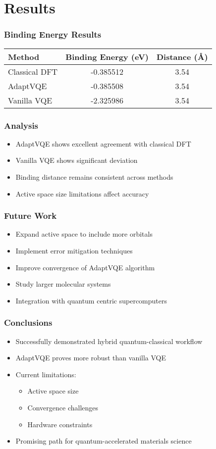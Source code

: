 \section{Results}

\begin{frame}
\frametitle{Binding Energy Results}
\begin{table}
\begin{tabular}{lcc}
\hline
Method & Binding Energy (eV) & Distance (Å) \\
\hline
Classical DFT & -0.385512 & 3.54 \\
AdaptVQE & -0.385508 & 3.54 \\
Vanilla VQE & -2.325986 & 3.54 \\
\hline
\end{tabular}
\end{table}
\end{frame}

\begin{frame}
\frametitle{Analysis}
\begin{itemize}
    \item AdaptVQE shows excellent agreement with classical DFT
    \item Vanilla VQE shows significant deviation
    \item Binding distance remains consistent across methods
    \item Active space size limitations affect accuracy
\end{itemize}
\end{frame}

\begin{frame}
\frametitle{Future Work}
\begin{itemize}
    \item Expand active space to include more orbitals
    \item Implement error mitigation techniques
    \item Improve convergence of AdaptVQE algorithm
    \item Study larger molecular systems
    \item Integration with quantum centric supercomputers
\end{itemize}
\end{frame}

\begin{frame}
\frametitle{Conclusions}
\begin{itemize}
    \item Successfully demonstrated hybrid quantum-classical workflow
    \item AdaptVQE proves more robust than vanilla VQE
    \item Current limitations:
    \begin{itemize}
        \item Active space size
        \item Convergence challenges
        \item Hardware constraints
    \end{itemize}
    \item Promising path for quantum-accelerated materials science
\end{itemize}
\end{frame} 